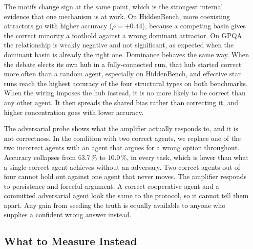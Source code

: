 The motifs change sign at the same point, which is the strongest internal
evidence that one mechanism is at work. On HiddenBench, more coexisting
attractors go with higher accuracy ($\rho = +0.44$), because a competing basin
gives the correct minority a foothold against a wrong dominant attractor. On GPQA
the relationship is weakly negative and not significant, as expected when the
dominant basin is already the right one. Dominance behaves the same way. When the
debate elects its own hub in a fully-connected run, that hub started correct more
often than a random agent, especially on HiddenBench, and effective star runs
reach the highest accuracy of the four structural types on both benchmarks. When
the wiring imposes the hub instead, it is no more likely to be correct than any
other agent. It then spreads the shared bias rather than correcting it, and
higher concentration goes with lower accuracy.

The adversarial probe shows what the amplifier actually responds to, and it is
not correctness. In the condition with two correct agents, we replace one of the
two incorrect agents with an agent that argues for a wrong option throughout.
Accuracy collapses from $63.7\,\%$ to $10.0\,\%$, in every task, which is lower
than what a single correct agent achieves without an adversary. Two correct
agents out of four cannot hold out against one agent that never moves. The
amplifier responds to persistence and forceful argument. A correct cooperative
agent and a committed adversarial agent look the same to the protocol, so it
cannot tell them apart. Any gain from seeding the truth is equally available to
anyone who supplies a confident wrong answer instead.

\subsection{What to Measure Instead}
\label{sec:discussion:design}

